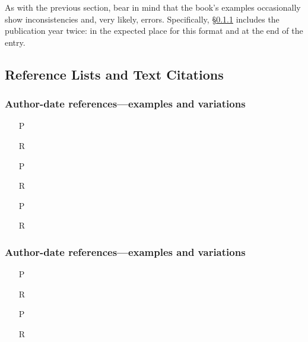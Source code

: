 \documentclass[11pt,letterpaper,oneside]{article}
\begin{document}
As with the previous section, bear in mind that the book's examples
occasionally show inconsistencies and, very likely, errors.
Specifically, \S\ref{15.9} includes the publication year twice: in the
expected place for this format and at the end of the entry.

\subsection{Reference Lists and Text Citations}
\setcounter{subsection}{15}

\setcounter{subsubsection}{8}
\subsubsection{Author-date references---examples and variations}
\label{15.9}

\begin{itemize}
\item[P] 

\item[R] 

\item[P] 

\item[R] 

\item[P] 

\item[R] 
\end{itemize}

\setcounter{subsubsection}{18}
\subsubsection{Author-date references---examples and variations}
\label{15.19}

\begin{itemize}
\item[P] \parencite[218]{fogel2004b}

\item[R] 

\item[P] \parencite[45--46]{fogel2004a}

\item[R] 
\end{itemize}
\end{document}
